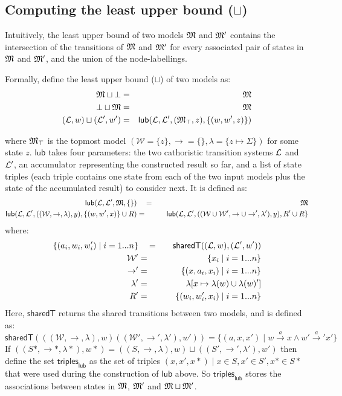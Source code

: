 \subsection{Computing the least upper bound ($\sqcup$)}

\NI Intuitively, the least upper bound of two models $\frak{M}$ and
$\frak{M}'$ contains the intersection of the transitions of $\frak{M}$ and
$\frak{M}'$ for every associated pair of states in $\frak{M}$ and $\frak{M}'$, and
the union of the node-labellings.

Formally, define the least upper bound ($\sqcup$) of two models as:
\begin{eqnarray*}
\frak{M} \sqcup \bot & = & \frak{M} \\
\bot \sqcup \frak{M} & = & \frak{M} \\
(\mathcal{L},w) \sqcup (\mathcal{L}',w') & = & \mathsf{lub}(\mathcal{L}, \mathcal{L}', (\frak{M}_\top, z), \{(w, w', z)\})
\end{eqnarray*}

\NI where $\frak{M}_\top$ is the topmost model $(\mathcal{W}=\{z\},
\rightarrow=\{\}, \lambda=\{z \mapsto \Sigma\})$ for some state $z$.
$\mathsf{lub}$ takes four parameters: the two cathoristic transition
systems $\mathcal{L}$ and $\mathcal{L}'$, an accumulator representing the
constructed result so far, and a list of state triples (each triple
contains one state from each of the two input models plus the state of
the accumulated result) to consider next.  It is defined as:
\begin{eqnarray*}
  \mathsf{lub}(\mathcal{L}, \mathcal{L}', \frak{M}, \{\}) 
     &\quad =\quad & 
  \frak{M} \\
  \mathsf{lub}(\mathcal{L}, \mathcal{L}', ((\mathcal{W}, \rightarrow, \lambda), y), \{(w,w',x)\} \cup R) 
     & = & 
  \mathsf{lub}(\mathcal{L}, \mathcal{L}', ((\mathcal{W} \cup \mathcal{W}', \rightarrow \cup \rightarrow', \lambda'), y), R' \cup R\}
\end{eqnarray*}
where:
\begin{eqnarray*}
  \{(a_i, w_i, w'_i) \;|\; i = 1 ... n\} 
     &\quad =\quad & 
  \mathsf{sharedT}((\mathcal{L},w), (\mathcal{L}',w')) \\
  \mathcal{W}' 
     & = & 
  \{x_i \;|\; i = 1 ... n\} \\
  \rightarrow' 
     & = & 
  \{(x, a_i, x_i) \;|\; i = 1 ... n\} \\
  \lambda' 
     & = & 
  \lambda [x \mapsto \lambda(w) \cup \lambda(w)'] \\
  R' 
     & = & 
  \{(w_i, w'_i, x_i) \;|\; i = 1 ... n\}
\end{eqnarray*}
Here, $\mathsf{sharedT}$ returns the shared transitions between two models, and is defined as:
\[
\mathsf{sharedT}(((\mathcal{W}, \rightarrow, \lambda),w) ((\mathcal{W}', \rightarrow', \lambda'),w')) =  \{(a, x, x') \;|\; w \xrightarrow{a} x \land w' \xrightarrow{a}' x'\}
\]
If $((S*,\rightarrow*,\lambda*),w*) = ((S,\rightarrow,\lambda),w) \sqcup ((S',\rightarrow',\lambda'),w')$ then define
the set $\mathsf{triples}_\mathsf{lub}$ as the set of triples $(x,x',x*) \; | \; x \in S, x' \in S', x* \in S*$ that were used during the construction of $\mathsf{lub}$ above. So $\mathsf{triples}_\mathsf{lub}$ stores the associations between states in $\frak{M}$, $\frak{M}'$ and $\frak{M} \sqcup \frak{M}'$. 

